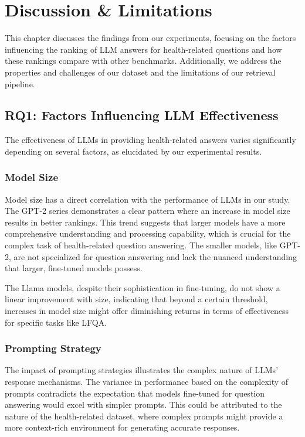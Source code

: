 
\chapter{Discussion \& Limitations}\label{discussion}

This chapter discusses the findings from our experiments, focusing on the factors influencing the ranking of LLM answers for health-related questions and how these rankings compare with other benchmarks. Additionally, we address the properties and challenges of our dataset and the limitations of our retrieval pipeline.

\section{RQ1: Factors Influencing LLM Effectiveness}

The effectiveness of LLMs in providing health-related answers varies significantly depending on several factors, as elucidated by our experimental results.

\subsection{Model Size}
Model size has a direct correlation with the performance of LLMs in our study. The GPT-2 series demonstrates a clear pattern where an increase in model size results in better rankings. This trend suggests that larger models have a more comprehensive understanding and processing capability, which is crucial for the complex task of health-related question answering. The smaller models, like GPT-2, are not specialized for question answering and lack the nuanced understanding that larger, fine-tuned models possess.

The Llama models, despite their sophistication in fine-tuning, do not show a linear improvement with size, indicating that beyond a certain threshold, increases in model size might offer diminishing returns in terms of effectiveness for specific tasks like LFQA.

\subsection{Prompting Strategy}
The impact of prompting strategies illustrates the complex nature of LLMs' response mechanisms. The variance in performance based on the complexity of prompts contradicts the expectation that models fine-tuned for question answering would excel with simpler prompts. This could be attributed to the nature of the health-related dataset, where complex prompts might provide a more context-rich environment for generating accurate responses.

